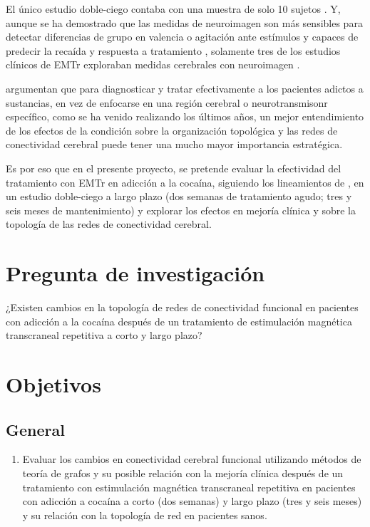 El único estudio doble-ciego contaba con una muestra de solo 10 sujetos \parencite{Bolloni2016}.
Y, aunque se ha demostrado que las medidas de neuroimagen son más sensibles para detectar diferencias de grupo en valencia o agitación ante estímulos \parencite{Goldstein2012a} y capaces de predecir la recaída y respuesta a tratamiento \parencite{Suckling2017}, solamente tres de los estudios clínicos de EMTr exploraban medidas cerebrales con neuroimagen \parencite{Kearney-Ramos2018a, Kearney-Ramos2019, Hanlon2015}. \par
\textcite{Steele2018} argumentan que para diagnosticar y tratar efectivamente a los pacientes adictos a sustancias, en vez de enfocarse en una región cerebral o neurotransmisonr específico, como se ha venido realizando los últimos años, un mejor entendimiento de los efectos de la condición sobre la organización topológica y las redes de conectividad cerebral puede tener una mucho mayor importancia estratégica. \par
Es por eso que en el presente proyecto, se pretende evaluar la efectividad del tratamiento con EMTr en adicción a la cocaína, siguiendo los lineamientos de \textcite{Ekhtiari2019}, en un estudio doble-ciego a largo plazo (dos semanas de tratamiento agudo; tres y seis meses de mantenimiento) y explorar los efectos en mejoría clínica y sobre la topología de las redes de conectividad cerebral.

\section{Pregunta de investigación}
¿Existen cambios en la topología de redes de conectividad funcional en pacientes con adicción a la cocaína después de un tratamiento de estimulación magnética transcraneal repetitiva a corto y largo plazo?

\section{Objetivos}
\subsection{General}
\begin{enumerate}[label=General., left= \parindent]
    \item Evaluar los cambios en conectividad cerebral funcional utilizando métodos de teoría de grafos y su posible relación con la mejoría clínica después de un tratamiento con estimulación magnética transcraneal repetitiva en pacientes con adicción a cocaína a corto (dos semanas) y largo plazo (tres y seis meses) y su relación con la topología de red en pacientes sanos.
\end{enumerate}
